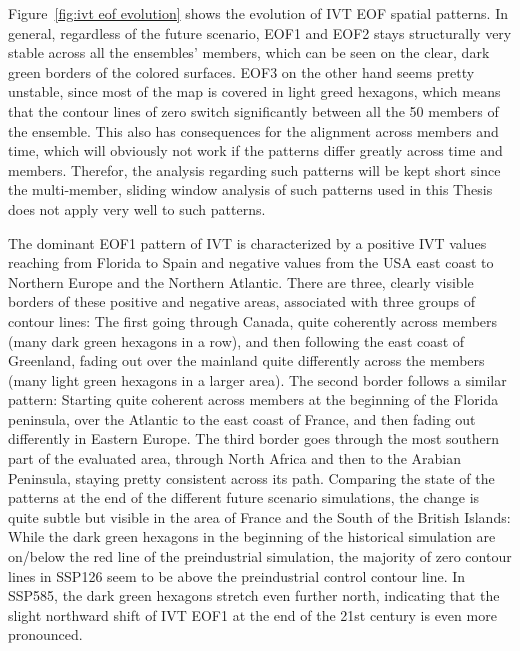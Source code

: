 Figure~\ref{fig:ivt eof evolution} shows the evolution of IVT EOF spatial patterns. 
In general, regardless of the future scenario, EOF1 and EOF2 stays structurally very stable across all the ensembles' members, which can be seen on the clear, dark green borders of the colored surfaces. 
EOF3 on the other hand seems pretty unstable, since most of the map is covered in light greed hexagons, which means that the contour lines of zero switch significantly between all the 50 members of the ensemble. 
This also has consequences for the alignment across members and time, which will obviously not work if the patterns differ greatly across time and members. 
Therefor, the analysis regarding such patterns will be kept short since the multi-member, sliding window analysis of such patterns used in this Thesis does not apply very well to such patterns. 

The dominant EOF1 pattern of IVT is characterized by a positive IVT values reaching from Florida to Spain and negative values from the USA east coast to Northern Europe and the Northern Atlantic. 
There are three, clearly visible borders of these positive and negative areas, associated with three groups of contour lines: The first going through Canada, quite coherently across members (many dark green hexagons in a row), and then following the east coast of Greenland, fading out over the mainland quite differently across the members (many light green hexagons in a larger area). 
The second border follows a similar pattern: Starting quite coherent across members at the beginning of the Florida peninsula, over the Atlantic to the east coast of France, and then fading out differently in Eastern Europe. 
The third border goes through the most southern part of the evaluated area, through North Africa and then to the Arabian Peninsula, staying pretty consistent across its path. 
Comparing the state of the patterns at the end of the different future scenario simulations, the change is quite subtle but visible in the area of France and the South of the British Islands:
While the dark green hexagons in the beginning of the historical simulation are on/below the red line of the preindustrial simulation, the majority of zero contour lines in SSP126 seem to be above the preindustrial control contour line. 
In SSP585, the dark green hexagons stretch even further north, indicating that the slight northward shift of IVT EOF1 at the end of the 21st century is even more pronounced. 

